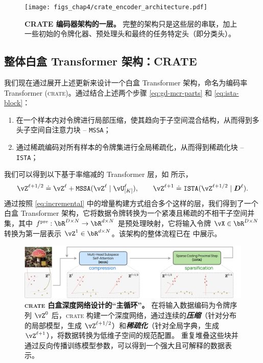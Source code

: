 \documentclass[../../book-main.tex]{subfiles}
\begin{document}
\begin{figure}
     \centering
     \texttt{[image: figs\_chap4/crate\_encoder\_architecture.pdf]}
    \caption{\small \textbf{CRATE 编码器架构的一层。} 完整的架构只是这些层的串联，加上一些初始的令牌化器、预处理头和最终的任务特定头（即分类头）。}
    \label{fig:arch-crate}
\end{figure}



\subsection{整体白盒 Transformer 架构：CRATE}

我们现在通过展开上述更新来设计一个白盒 Transformer 架构，命名为编码率 Transformer (\textsc{crate})。通过结合上述两个步骤 \eqref{eq:gd-mcr-parts} 和 \eqref{eq:ista-block}：
\begin{enumerate}[leftmargin=0.7cm]
    \item 在一个样本内对令牌进行局部压缩，使其趋向于子空间混合结构，从而得到多头子空间自注意力块 -- \texttt{MSSA}；
    \item 通过稀疏编码对所有样本的令牌集进行全局稀疏化，从而得到稀疏化块 -- \texttt{ISTA}；
\end{enumerate}
我们可以得到以下基于率缩减的 Transformer 层，如  所示，
\begin{equation}
    \vZ^{\ell+1/2} \doteq \vZ^{\ell} + \texttt{MSSA}(\vZ^{\ell} \mid \vU_{[K]}^{\ell}),
    \qquad
    \vZ^{\ell+1}\doteq \texttt{ISTA}(\vZ^{\ell+1/2} \mid \bm D^\ell).
\end{equation}
通过按照 \eqref{eq:incremental} 中的增量构建方式组合多个这样的层，我们得到了一个白盒 Transformer 架构，它将数据令牌转换为一个紧凑且稀疏的不相干子空间并集，其中 $f^{\pre}: \bR^{D \times N} \rightarrow \bR^{d \times N}$ 是预处理映射，它将输入令牌 $\vX \in \bR^{D \times N}$ 转换为第一层表示 $\vZ^{1} \in \bR^{d \times N}$。该架构的整体流程已在  中展示。

\begin{figure}[t!]
     \centering
         \includegraphics[width=\textwidth]{figs_chap4/CRATE_fig1_patches.pdf}
     \vspace{-0.1in}
     \caption{
     \textbf{\textsc{crate} 白盒深度网络设计的“主循环”。}
     在将输入数据编码为令牌序列 $\vZ^0$ 后，\textsc{crate} 构建一个深度网络，通过连续的{\textit{\textbf{压缩}}}（针对分布的局部模型，生成 $\vZ^{\ell+1/2}$）和{\textit{\textbf{稀疏化}}}（针对全局字典，生成 $\vZ^{\ell+1}$），将数据转换为低维子空间的规范配置。
     重复堆叠这些块并通过反向传播训练模型参数，可以得到一个强大且可解释的数据表示。
     }
        \label{fig:crate-diagram}
\end{figure}
\end{document}
